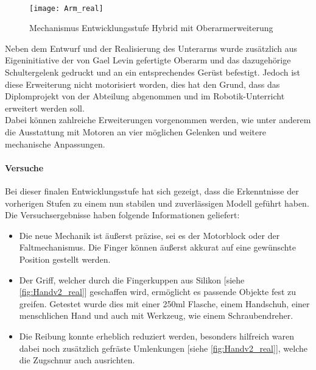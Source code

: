 \documentclass[titlepage,12pt,twoside]{article}
\begin{document}
\\
\begin{figure}[H]
	\begin{center}
		\scalebox{1}
		{\texttt{[image: Arm\_real]}}
		\caption{Mechanismus Entwicklungsstufe Hybrid mit Oberarmerweiterung}
		\label{fig:Arm_real}			
	\end{center}
\end{figure}
\hfill \break
Neben dem Entwurf und der Realisierung des Unterarms wurde zusätzlich aus 
Eigeninitiative der von Gael Levin gefertigte Oberarm und das dazugehörige 
Schultergelenk gedruckt und an ein entsprechendes Gerüst befestigt. Jedoch ist diese 
Erweiterung nicht motorisiert worden, dies hat den Grund, dass das Diplomprojekt
von der Abteilung abgenommen und im Robotik-Unterricht erweitert werden soll. \\
Dabei können zahlreiche Erweiterungen vorgenommen werden, wie unter anderem die 
Ausstattung mit Motoren an vier möglichen Gelenken und weitere mechanische 
Anpassungen. \\
\newpage
\paragraph{Versuche}
\hfill \break
\hfill \break
Bei dieser finalen Entwicklungsstufe hat sich gezeigt, dass die Erkenntnisse der 
vorherigen Stufen zu einem nun stabilen und zuverlässigen Modell geführt haben. 
Die Versuchsergebnisse haben folgende Informationen geliefert: \\
\begin{itemize}
	\item Die neue Mechanik ist äußerst präzise, sei es der Motorblock oder der 
	Faltmechanismus. Die Finger können äußerst akkurat auf eine gewünschte 
	Position gestellt werden.
	\item Der Griff, welcher durch die Fingerkuppen aus Silikon [siehe \textcolor{blue}{\autoref{fig:Handv2_real}}] geschaffen wird, 
	ermöglicht es passende Objekte fest zu greifen. Getestet wurde dies mit einer 
	250ml Flasche, einem Handschuh, einer menschlichen Hand und auch mit Werkzeug, 
	wie einem Schraubendreher. 
	\item Die Reibung konnte erheblich reduziert werden, besonders hilfreich waren 
	dabei noch zusätzlich gefräste Umlenkungen [siehe \textcolor{blue}{\autoref{fig:Handv2_real}}], welche die Zugschnur auch 
	ausrichten. 
\end{itemize}
\end{document}
